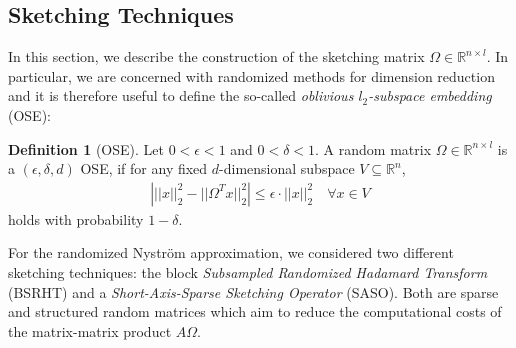 \documentclass{article}
\theoremstyle{definition}
\newtheorem{definition}{Definition}[section]
\begin{document}
\subsection{Sketching Techniques}
In this section, we describe the construction of the sketching matrix $\Omega \in \mathbb{R}^{n \times l}$. In particular, we are concerned with randomized methods for dimension reduction and it is therefore useful to define the so-called \textit{oblivious $l_2$-subspace embedding} (OSE):
\begin{definition}[OSE]
    Let $0 < \epsilon < 1$ and $0 < \delta < 1$. A random matrix $\Omega \in \mathbb{R}^{n \times l}$ is a $(\epsilon, \delta, d)$ OSE, if for any fixed $d$-dimensional subspace $V \subseteq \mathbb{R}^{n}$, 
    \begin{align*}
        \left| ||x||_2^2 - ||\Omega^T x||_2^2 \right| \leq \epsilon \cdot ||x||_2^2
        \quad \forall x \in V 
    \end{align*}
    holds with probability $1 - \delta$.
\end{definition}

For the randomized Nyström approximation, we considered two different sketching techniques: the block \textit{Subsampled Randomized Hadamard Transform} (BSRHT) and a \textit{Short-Axis-Sparse Sketching Operator} (SASO). Both are sparse and structured random matrices which aim to reduce the computational costs of the matrix-matrix product $A \Omega$.
\end{document}
